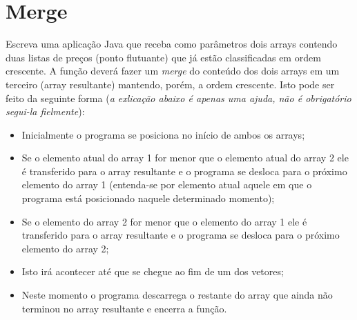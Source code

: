 \documentclass[12pt,a4paper, brazil]{article}
\begin{document}
\section{Merge}
Escreva uma aplicação Java que receba como parâmetros dois arrays contendo duas listas de preços (ponto flutuante) que já estão classificadas em ordem crescente. A função deverá fazer um \textit{merge} do conteúdo dos dois arrays em um terceiro (array resultante) mantendo, porém, a ordem crescente. Isto pode ser feito da seguinte forma (\textit{a exlicação abaixo é apenas uma ajuda, não é obrigatório segui-la fielmente}):
\begin{itemize}
    \item Inicialmente o programa se posiciona no início de ambos os arrays;
    \item Se o elemento atual do array 1 for menor que o elemento atual do array 2 ele é transferido para o array resultante e o programa se desloca para o próximo elemento do array 1 (entenda-se por elemento atual aquele em que o programa está posicionado naquele determinado momento);
    \item Se o elemento do array 2 for menor que o elemento do array 1 ele é transferido para o array resultante e o programa se desloca para o próximo elemento do array 2;
    \item Isto irá acontecer até que se chegue ao fim de um dos vetores; 
    \item Neste momento o programa descarrega o restante do array que ainda não terminou no array resultante e encerra a função.
\end{itemize}





\end{document}
